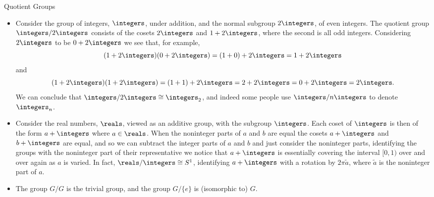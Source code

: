 \documentclass[fleqn]{NotesClass}
\newcommand{\cyclicGroupZ}[1][n]{\integers_{#1}}
\newcommand{\sphere}[1][n]{S^{#1}}
\newcommand{\isomorphic}{\cong}
\begin{document}
    \begin{dfn}{Quotient Groups}{}
        \begin{itemize}
            \item Consider the group of integers, \(\integers\), under addition, and the normal subgroup \(2\integers\), of even integers.
            The quotient group \(\integers/2\integers\) consists of the cosets \(2\integers\) and \(1 + 2\integers\), where the second is all odd integers.
            Considering \(2\integers\) to be \(0 + 2\integers\) we see that, for example,
            \begin{equation}
                (1 + 2\integers)(0 + 2\integers) = (1 + 0) + 2\integers = 1 + 2\integers
            \end{equation}
            and
            \begin{equation}
                (1 + 2\integers)(1 + 2\integers) = (1 + 1) + 2\integers = 2 + 2\integers = 0 + 2\integers = 2\integers.
            \end{equation}
            We can conclude that \(\integers/2\integers \isomorphic \cyclicGroupZ[2]\), and indeed some people use \(\integers/n\integers\) to denote \(\cyclicGroupZ\).
            
            \item Consider the real numbers, \(\reals\), viewed as an additive group, with the subgroup \(\integers\).
            Each coset of \(\integers\) is then of the form \(a + \integers\) where \(a \in \reals\).
            When the noninteger parts of \(a\) and \(b\) are equal the cosets \(a + \integers\) and \(b + \integers\) are equal, and so we can subtract the integer parts of \(a\) and \(b\) and just consider the noninteger parts, identifying the groups with the noninteger part of their representative we notice that \(a + \integers\) is essentially covering the interval \([0, 1)\) over and over again as \(a\) is varied.
            In fact, \(\reals/\integers \isomorphic \sphere[1]\), identifying \(a + \integers\) with a rotation by \(2\pi\tilde{a}\), where \(\tilde{a}\) is the noninteger part of \(a\).
            
            \item The group \(G/G\) is the trivial group, and the group \(G/\{e\}\) is (isomorphic to) \(G\).
        \end{itemize}
    \end{dfn}
    
\end{document}
